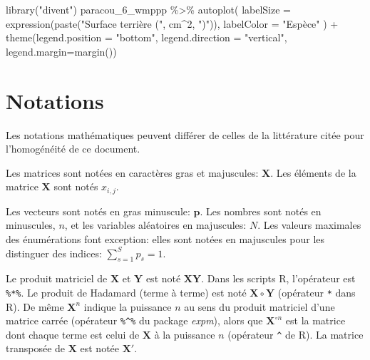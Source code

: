 \documentclass[
  11pt,
  american,
  a4paper,
  extrafontsizes,onecolumn,openright
  ]{memoir}
\newenvironment{Shaded}{\begin{snugshade}}{\end{snugshade}}
\newcommand{\AttributeTok}[1]{\textcolor[rgb]{0.77,0.63,0.00}{#1}}
\newcommand{\DecValTok}[1]{\textcolor[rgb]{0.00,0.00,0.81}{#1}}
\newcommand{\FunctionTok}[1]{\textcolor[rgb]{0.00,0.00,0.00}{#1}}
\newcommand{\NormalTok}[1]{#1}
\newcommand{\SpecialCharTok}[1]{\textcolor[rgb]{0.00,0.00,0.00}{#1}}
\newcommand{\StringTok}[1]{\textcolor[rgb]{0.31,0.60,0.02}{#1}}
\newlength{\rf}
\begin{document}
\begin{Shaded}
\begin{Highlighting}[]
\FunctionTok{library}\NormalTok{(}\StringTok{"divent"}\NormalTok{)}
\NormalTok{paracou\_6\_wmppp }\SpecialCharTok{\%\textgreater{}\%} 
\FunctionTok{autoplot}\NormalTok{(}
  \AttributeTok{labelSize =} \FunctionTok{expression}\NormalTok{(}\FunctionTok{paste}\NormalTok{(}\StringTok{"Surface terrière ("}\NormalTok{, cm}\SpecialCharTok{\^{}}\DecValTok{2}\NormalTok{, }\StringTok{")"}\NormalTok{)), }
  \AttributeTok{labelColor =} \StringTok{"Espèce"}
\NormalTok{) }\SpecialCharTok{+}
\FunctionTok{theme}\NormalTok{(}\AttributeTok{legend.position =} \StringTok{"bottom"}\NormalTok{, }\AttributeTok{legend.direction =} \StringTok{"vertical"}\NormalTok{, }\AttributeTok{legend.margin=}\FunctionTok{margin}\NormalTok{())}
\end{Highlighting}
\end{Shaded}

\normalsize

\hypertarget{notations}{%
\chapter*{Notations}\label{notations}}

Les notations mathématiques peuvent différer de celles de la littérature citée pour l'homogénéité de ce document.

Les matrices sont notées en caractères gras et majuscules: \(\mathbf{X}\).
Les éléments de la matrice \(\mathbf{X}\) sont notés \(x_{i,j}\).

Les vecteurs sont notés en gras minuscule: \(\mathbf{p}\).
Les nombres sont notés en minuscules, \(n\), et les variables aléatoires en majuscules: \(N\).
Les valeurs maximales des énumérations font exception: elles sont notées en majuscules pour les distinguer des indices: \(\sum_{s=1}^{S}{p_s}=1\).

Le produit matriciel de \(\mathbf{X}\) et \(\mathbf{Y}\) est noté \(\mathbf{X}\mathbf{Y}\). Dans les scripts R, l'opérateur est \texttt{\%*\%}.
Le produit de Hadamard (terme à terme) est noté \(\mathbf{X}\circ\mathbf{Y}\) (opérateur \texttt{*} dans R).
De même \(\mathbf{X}^n\) indique la puissance \(n\) au sens du produit matriciel d'une matrice carrée (opérateur \texttt{\%\^{}\%} du package \emph{expm}), alors que \(\mathbf{X}^{\circ n}\) est la matrice dont chaque terme est celui de \(\mathbf{X}\) à la puissance \(n\) (opérateur \texttt{\^{}} de R).
La matrice transposée de \(\mathbf{X}\) est notée \(\mathbf{X'}\).
\end{document}
